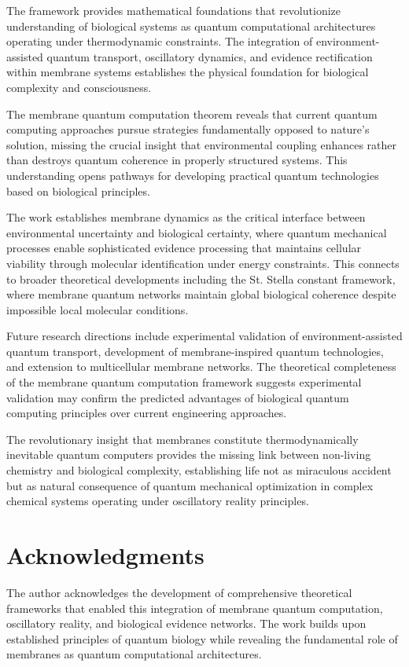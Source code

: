 \documentclass[12pt,a4paper]{article}
\begin{document}
The framework provides mathematical foundations that revolutionize understanding of biological systems as quantum computational architectures operating under thermodynamic constraints. The integration of environment-assisted quantum transport, oscillatory dynamics, and evidence rectification within membrane systems establishes the physical foundation for biological complexity and consciousness.

The membrane quantum computation theorem reveals that current quantum computing approaches pursue strategies fundamentally opposed to nature's solution, missing the crucial insight that environmental coupling enhances rather than destroys quantum coherence in properly structured systems. This understanding opens pathways for developing practical quantum technologies based on biological principles.

The work establishes membrane dynamics as the critical interface between environmental uncertainty and biological certainty, where quantum mechanical processes enable sophisticated evidence processing that maintains cellular viability through molecular identification under energy constraints. This connects to broader theoretical developments including the St. Stella constant framework, where membrane quantum networks maintain global biological coherence despite impossible local molecular conditions.

Future research directions include experimental validation of environment-assisted quantum transport, development of membrane-inspired quantum technologies, and extension to multicellular membrane networks. The theoretical completeness of the membrane quantum computation framework suggests experimental validation may confirm the predicted advantages of biological quantum computing principles over current engineering approaches.

The revolutionary insight that membranes constitute thermodynamically inevitable quantum computers provides the missing link between non-living chemistry and biological complexity, establishing life not as miraculous accident but as natural consequence of quantum mechanical optimization in complex chemical systems operating under oscillatory reality principles.

\section{Acknowledgments}

The author acknowledges the development of comprehensive theoretical frameworks that enabled this integration of membrane quantum computation, oscillatory reality, and biological evidence networks. The work builds upon established principles of quantum biology while revealing the fundamental role of membranes as quantum computational architectures.
\end{document}
